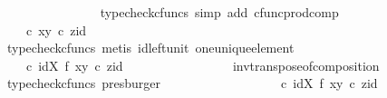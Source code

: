\begin{isabellebody}
\ \ \ \ \ \ \ \ \ \ \ \ \ \ \isamarkupfalse%
\ {\isacharparenleft}{\kern0pt}typecheck{\isacharunderscore}{\kern0pt}cfuncs{\isacharcomma}{\kern0pt}\ simp\ add{\isacharcolon}{\kern0pt}\ cfunc{\isacharunderscore}{\kern0pt}prod{\isacharunderscore}{\kern0pt}comp{\isacharparenright}{\kern0pt}\isanewline
\ \ \ \ \ \ \ \ \ \ \ \ \isamarkupfalse%
\ \isamarkupfalse%
\ {\isachardoublequoteopen}{\isachardot}{\kern0pt}{\isachardot}{\kern0pt}{\isachardot}{\kern0pt}\ {\isacharequal}{\kern0pt}\ {\isacharparenleft}{\kern0pt}{\isasymTheta}\ {\isasymcirc}\isactrlsub c\ {\isasymlangle}x{\isacharcomma}{\kern0pt}y{\isasymrangle}{\isacharparenright}{\kern0pt}\isactrlsup {\isasymflat}\ {\isasymcirc}\isactrlsub c\ {\isasymlangle}z{\isacharcomma}{\kern0pt}id\ {\isasymone}{\isasymrangle}{\isachardoublequoteclose}\isanewline
\ \ \ \ \ \ \ \ \ \ \ \ \ \ \isamarkupfalse%
\ {\isacharparenleft}{\kern0pt}typecheck{\isacharunderscore}{\kern0pt}cfuncs{\isacharcomma}{\kern0pt}\ metis\ id{\isacharunderscore}{\kern0pt}left{\isacharunderscore}{\kern0pt}unit{}\ one{\isacharunderscore}{\kern0pt}unique{\isacharunderscore}{\kern0pt}element{\isacharparenright}{\kern0pt}\isanewline
\ \ \ \ \ \ \ \ \ \ \ \ \isamarkupfalse%
\ \isamarkupfalse%
\ {\isachardoublequoteopen}{\isachardot}{\kern0pt}{\isachardot}{\kern0pt}{\isachardot}{\kern0pt}\ {\isacharequal}{\kern0pt}\ {\isacharparenleft}{\kern0pt}{\isasymTheta}\isactrlsup {\isasymflat}\ {\isasymcirc}\isactrlsub c\ {\isacharparenleft}{\kern0pt}id{\isacharparenleft}{\kern0pt}X{\isacharparenright}{\kern0pt}\ {\isasymtimes}\isactrlsub f\ {\isasymlangle}x{\isacharcomma}{\kern0pt}y{\isasymrangle}{\isacharparenright}{\kern0pt}{\isacharparenright}{\kern0pt}\ {\isasymcirc}\isactrlsub c\ {\isasymlangle}z{\isacharcomma}{\kern0pt}id\ {\isasymone}{\isasymrangle}{\isachardoublequoteclose}\isanewline
\ \ \ \ \ \ \ \ \ \ \ \ \ \ \isamarkupfalse%
\ inv{\isacharunderscore}{\kern0pt}transpose{\isacharunderscore}{\kern0pt}of{\isacharunderscore}{\kern0pt}composition\ \isamarkupfalse%
\ {\isacharparenleft}{\kern0pt}typecheck{\isacharunderscore}{\kern0pt}cfuncs{\isacharcomma}{\kern0pt}\ presburger{\isacharparenright}{\kern0pt}\isanewline
\ \ \ \ \ \ \ \ \ \ \ \ \isamarkupfalse%
\ \isamarkupfalse%
\ {\isachardoublequoteopen}{\isachardot}{\kern0pt}{\isachardot}{\kern0pt}{\isachardot}{\kern0pt}\ {\isacharequal}{\kern0pt}\ {\isasymTheta}\isactrlsup {\isasymflat}\ {\isasymcirc}\isactrlsub c\ {\isacharparenleft}{\kern0pt}id{\isacharparenleft}{\kern0pt}X{\isacharparenright}{\kern0pt}\ {\isasymtimes}\isactrlsub f\ {\isasymlangle}x{\isacharcomma}{\kern0pt}y{\isasymrangle}{\isacharparenright}{\kern0pt}\ {\isasymcirc}\isactrlsub c\ {\isasymlangle}z{\isacharcomma}{\kern0pt}id\ {\isasymone}{\isasymrangle}{\isachardoublequoteclose}\isanewline

\end{isabellebody}
